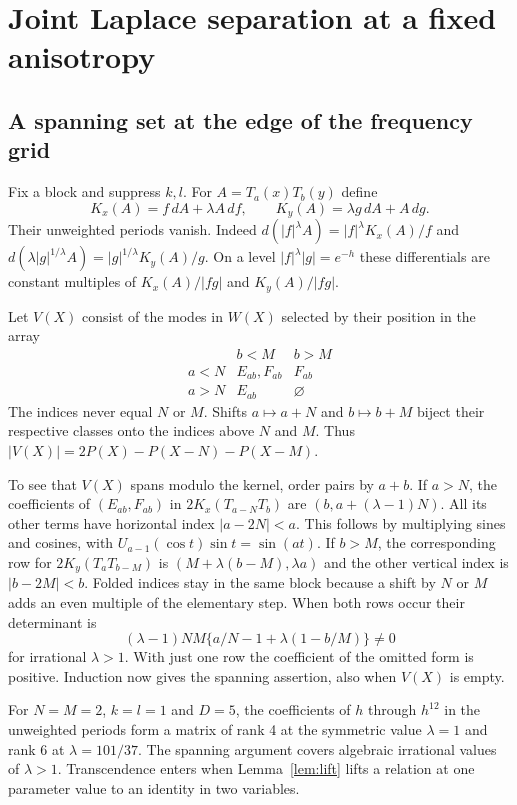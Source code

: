 \section{Joint Laplace separation at a fixed anisotropy}\label{sec:pure}

\subsection{A spanning set at the edge of the frequency grid}
Fix a block and suppress $k,l$. For $A=T_a(x)T_b(y)$ define
\[
 K_x(A)=f\,dA+\lambda A\,df,\qquad K_y(A)=\lambda g\,dA+A\,dg .
\]
Their unweighted periods vanish. Indeed $d(|f|^\lambda A)=|f|^\lambda K_x(A)/f$ and
$d(\lambda|g|^{1/\lambda}A)=|g|^{1/\lambda}K_y(A)/g$.
On a level $|f|^\lambda|g|=e^{-h}$ these differentials are constant multiples of $K_x(A)/|fg|$ and $K_y(A)/|fg|$.

Let $V(X)$ consist of the modes in $W(X)$ selected by their position in the array
\[
 \begin{array}{c|cc}
 &b<M&b>M\\ \hline
 a<N&E_{ab},F_{ab}&F_{ab}\\
 a>N&E_{ab}&\varnothing
 \end{array}
\]
The indices never equal $N$ or $M$. Shifts $a\mapsto a+N$ and $b\mapsto b+M$ biject their respective classes onto the indices above $N$ and $M$. Thus $|V(X)|=2P(X)-P(X-N)-P(X-M)$.

To see that $V(X)$ spans modulo the kernel, order pairs by $a+b$. If $a>N$, the coefficients of $(E_{ab},F_{ab})$ in $2K_x(T_{a-N}T_b)$ are $(b,a+(\lambda-1)N)$. All its other terms have horizontal index $|a-2N|<a$. This follows by multiplying sines and cosines, with $U_{a-1}(\cos t)\sin t=\sin(at)$. If $b>M$, the corresponding row for $2K_y(T_aT_{b-M})$ is $(M+\lambda(b-M),\lambda a)$ and the other vertical index is $|b-2M|<b$. Folded indices stay in the same block because a shift by $N$ or $M$ adds an even multiple of the elementary step. When both rows occur their determinant is
\[
 (\lambda-1)NM\{a/N-1+\lambda(1-b/M)\}\ne0
\]
for irrational $\lambda>1$. With just one row the coefficient of the omitted form is positive. Induction now gives the spanning assertion, also when $V(X)$ is empty.

For $N=M=2$, $k=l=1$ and $D=5$, the coefficients of $h$ through $h^{12}$ in the unweighted periods form a matrix of rank 4 at the symmetric value $\lambda=1$ and rank 6 at $\lambda=101/37$. The spanning argument covers algebraic irrational values of $\lambda>1$. Transcendence enters when Lemma~\ref{lem:lift} lifts a relation at one parameter value to an identity in two variables.

